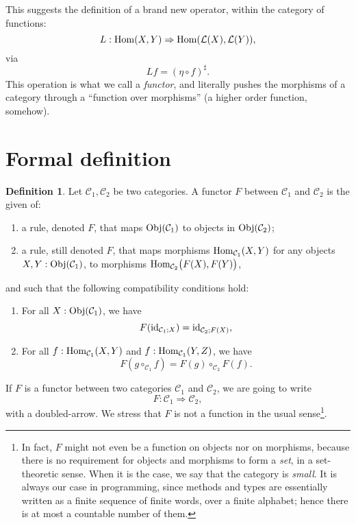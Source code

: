 \documentclass[12pt,a4paper]{report}
\renewcommand{\baselinestretch}{1.5}
\theoremstyle{theorem}
\theoremstyle{definition}
\newtheorem{definition}{Definition}
\begin{document}
\renewcommand{\baselinestretch}{1.5} 
\selectfont

This suggests the definition of a brand new operator,
within the category of functions:
	\[ L : {\rm Hom}(X,Y) \Rightarrow {\rm Hom}(\mathcal{L}(X),\mathcal{L}(Y)),\]
via
	\[ Lf = (\eta\circ f)^\sharp .\]
This operation is what we call a \emph{functor}, and
literally pushes the morphisms of a category through a ``function
over morphisms'' (a higher order function, somehow).

\section{Formal definition}

\begin{definition}
Let $\mathcal{C}_1,\mathcal{C}_2$ be two categories.
A functor $F$ between $\mathcal{C}_1$ and $\mathcal{C}_2$
is the given of:
	\begin{enumerate}
		\item a rule, denoted $F$, that maps ${\rm Obj}(\mathcal{C}_1)$
		to objects in ${\rm Obj}(\mathcal{C}_2)$;
		\item a rule, still denoted $F$, that maps morphisms
		${\rm Hom}_{\mathcal{C}_1}(X,Y)$ for any objects
		$X,Y:{\rm Obj}(\mathcal{C}_1)$,
		to morphisms ${\rm Hom}_{\mathcal{C}_2}\big(F(X),F(Y)\big)$,
	\end{enumerate}
and such that the following compatibility conditions hold:
	\begin{enumerate}
		\item For all $X:{\rm Obj}(\mathcal{C}_1)$, we have
			\[ F({\rm id}_{\mathcal{C}_1;X})
				= {\rm id}_{\mathcal{C}_2;F(X)} ,\]
		\item For all $f:{\rm Hom}_{\mathcal{C}_1}(X,Y)$
		and $f:{\rm Hom}_{\mathcal{C}_1}(Y,Z)$, we have
			\[ F(g\circ_{\mathcal{C}_1} f) = F(g)\circ_{\mathcal{C}_2} F(f) .\]
	\end{enumerate}
\end{definition}

If $F$ is a functor between two categories
$\mathcal{C}_1$ and $\mathcal{C}_2$, we are going to write
	\[ F : \mathcal{C}_1\Rightarrow \mathcal{C}_2 ,\]
with a doubled-arrow. We stress that $F$ is not a function in the usual
sense\footnote{In fact, $F$ might not even be a function on objects nor
on morphisms, because there is no requirement for objects and
morphisms to form a \emph{set}, in a set-theoretic sense. When it is the
case, we say that the category is \emph{small}. It is always our case
in programming, since methods and types are essentially written as a finite
sequence of finite words, over a finite alphabet; hence there is at most
a countable number of them.}.
\end{document}
